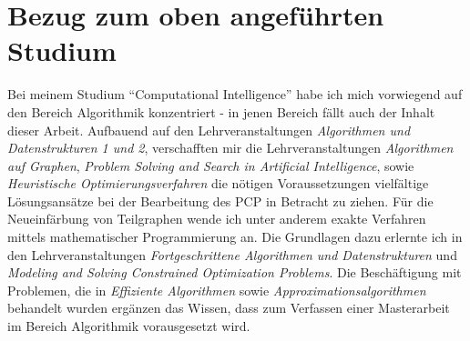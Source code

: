 \documentclass{article}
\begin{document}
\section{Bezug zum oben angeführten Studium}

Bei meinem Studium ``Computational Intelligence'' habe ich mich vorwiegend auf den Bereich Algorithmik konzentriert - in jenen Bereich fällt auch der Inhalt dieser Arbeit. Aufbauend auf den Lehrveranstaltungen \textit{Algorithmen und Datenstrukturen 1 und 2}, verschafften mir die Lehrveranstaltungen \textit{Algorithmen auf Graphen}, \textit{Problem Solving and Search in Artificial Intelligence}, sowie \textit{Heuristische Optimierungsverfahren} die nötigen Voraussetzungen vielfältige Lösungsansätze bei der Bearbeitung des PCP in Betracht zu ziehen. Für die Neueinfärbung von Teilgraphen wende ich unter anderem exakte Verfahren mittels mathematischer Programmierung an. Die Grundlagen dazu erlernte ich in den Lehrveranstaltungen \textit{Fortgeschrittene Algorithmen und Datenstrukturen} und \textit{Modeling and Solving Constrained Optimization Problems}. Die Beschäftigung mit Problemen, die in \textit{Effiziente Algorithmen} sowie \textit{Approximationsalgorithmen} behandelt wurden ergänzen das Wissen, dass zum Verfassen einer Masterarbeit im Bereich Algorithmik vorausgesetzt wird.

			     			      
\end{document}

